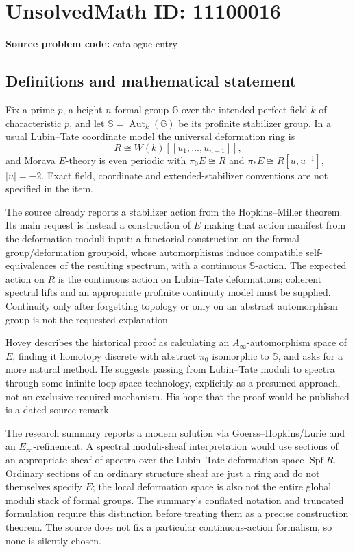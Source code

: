 \documentclass[11pt]{article}
\begin{document}
\section*{UnsolvedMath ID: 11100016}
\textbf{Source problem code:} catalogue entry
\subsection{Definitions and mathematical statement}
Fix a prime \(p\), a height-\(n\) formal group \(\mathbb G\) over the intended perfect field \(k\) of characteristic \(p\), and let \(\mathbb S=\operatorname{Aut}_k(\mathbb G)\) be its profinite stabilizer group. In a usual Lubin--Tate coordinate model the universal deformation ring is
\[R\cong W(k)[[u_1,\ldots,u_{n-1}]],\]
and Morava \(E\)-theory is even periodic with \(\pi_0E\cong R\) and \(\pi_*E\cong R[u,u^{-1}]\), \(|u|=-2\). Exact field, coordinate and extended-stabilizer conventions are not specified in the item.

The source already reports a stabilizer action from the Hopkins--Miller theorem. Its main request is instead a construction of \(E\) making that action manifest from the deformation-moduli input: a functorial construction on the formal-group/deformation groupoid, whose automorphisms induce compatible self-equivalences of the resulting spectrum, with a continuous \(\mathbb S\)-action. The expected action on \(R\) is the continuous action on Lubin--Tate deformations; coherent spectral lifts and an appropriate profinite continuity model must be supplied. Continuity only after forgetting topology or only on an abstract automorphism group is not the requested explanation.

Hovey describes the historical proof as calculating an \(A_\infty\)-automorphism space of \(E\), finding it homotopy discrete with abstract \(\pi_0\) isomorphic to \(\mathbb S\), and asks for a more natural method. He suggests passing from Lubin--Tate moduli to spectra through some infinite-loop-space technology, explicitly as a presumed approach, not an exclusive required mechanism. His hope that the proof would be published is a dated source remark.

The research summary reports a modern solution via Goerss--Hopkins/Lurie and an \(E_\infty\)-refinement. A spectral moduli-sheaf interpretation would use sections of an appropriate sheaf of spectra over the Lubin--Tate deformation space \(\operatorname{Spf}R\). Ordinary sections of an ordinary structure sheaf are just a ring and do not themselves specify \(E\); the local deformation space is also not the entire global moduli stack of formal groups. The summary's conflated notation and truncated formulation require this distinction before treating them as a precise construction theorem. The source does not fix a particular continuous-action formalism, so none is silently chosen.
\end{document}
